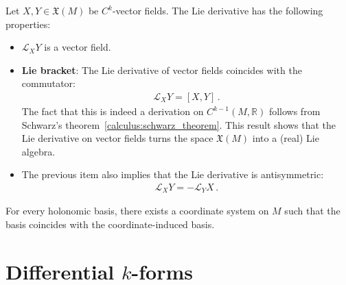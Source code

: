     \begin{property}\label{bundle:lie_bracket}
        Let $X,Y\in\mathfrak{X}(M)$ be $C^k$-vector fields. The Lie derivative has the following properties:
        \begin{itemize}
            \item $\mathcal{L}_XY$ is a vector field.
            \item\textbf{Lie bracket}: The Lie derivative of vector fields coincides with the commutator:
                \begin{gather}
                    \mathcal{L}_XY = [X,Y]\,.
                \end{gather}
                The fact that this is indeed a derivation on $C^{k-1}(M,\mathbb{R})$ follows from Schwarz's theorem~\ref{calculus:schwarz_theorem}. This result shows that the Lie derivative on vector fields turns the space $\mathfrak{X}(M)$ into a (real) Lie algebra.
            \item The previous item also implies that the Lie derivative is antisymmetric:
                \begin{gather}
                    \label{bundle:lie_derivative_antisymmetry}
                    \mathcal{L}_XY = -\mathcal{L}_YX\,.
                \end{gather}
        \end{itemize}
    \end{property}

    \begin{property}
        For every holonomic basis, there exists a coordinate system on $M$ such that the basis coincides with the coordinate-induced basis.
    \end{property}

\section{Differential \texorpdfstring{$k$}{k}-forms}\label{section:forms}

